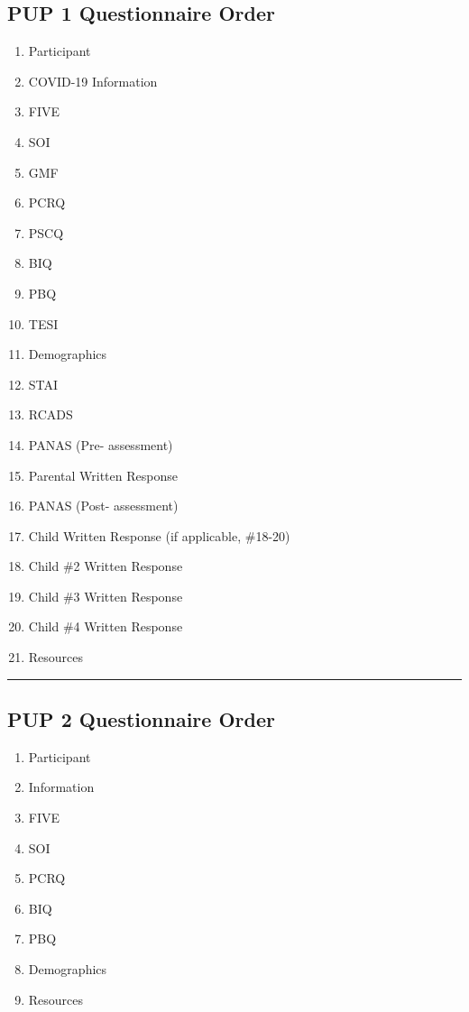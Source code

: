\documentclass[]{book}
\providecommand{\tightlist}{%
  \setlength{\itemsep}{0pt}\setlength{\parskip}{0pt}}
\begin{document}
\hypertarget{pup-1-questionnaire-order}{%
\subsection{PUP 1 Questionnaire Order}\label{pup-1-questionnaire-order}}

\begin{enumerate}
\def\labelenumi{\arabic{enumi}.}
\tightlist
\item
  Participant
\item
  COVID-19 Information
\item
  FIVE
\item
  SOI
\item
  GMF
\item
  PCRQ
\item
  PSCQ
\item
  BIQ
\item
  PBQ
\item
  TESI
\item
  Demographics
\item
  STAI
\item
  RCADS
\item
  PANAS (Pre- assessment)
\item
  Parental Written Response
\item
  PANAS (Post- assessment)
\item
  Child Written Response
  (if applicable, \#18-20)
\item
  Child \#2 Written Response
\item
  Child \#3 Written Response
\item
  Child \#4 Written Response
\item
  Resources
\end{enumerate}

\begin{center}\rule{0.5\linewidth}{0.5pt}\end{center}

\hypertarget{pup-2-questionnaire-order}{%
\subsection{PUP 2 Questionnaire Order}\label{pup-2-questionnaire-order}}

\begin{enumerate}
\def\labelenumi{\arabic{enumi}.}
\tightlist
\item
  Participant
\item
  Information
\item
  FIVE
\item
  SOI
\item
  PCRQ
\item
  BIQ
\item
  PBQ
\item
  Demographics
\item
  Resources
\end{enumerate}
\end{document}
